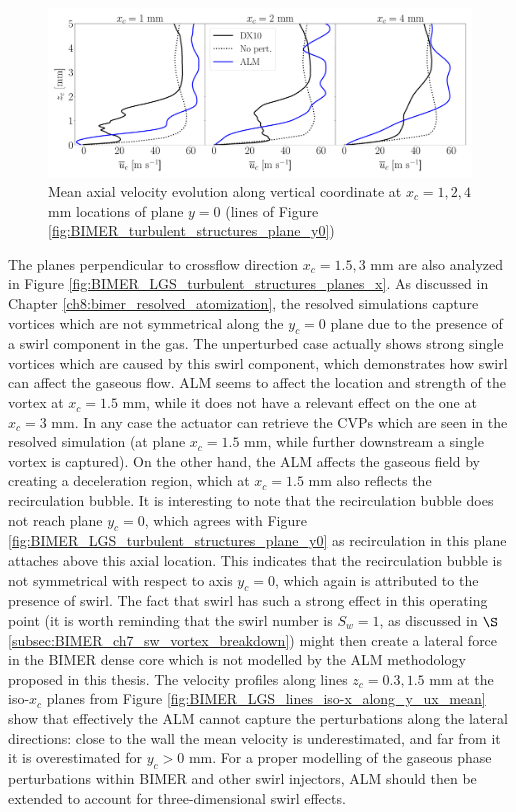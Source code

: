 \begin{figure}[ht]
\centering
   \includegraphics[scale=0.24]{./part3_applications/figures_ch9_lagrangian/gas_field_initial_conditions/lines_y0_along_z_ux_mean}
\caption{Mean axial velocity evolution along vertical coordinate at $x_c = 1, 2, 4$ mm locations of plane $y = 0$ (lines of Figure \ref{fig:BIMER_turbulent_structures_plane_y0})}
\label{fig:BIMER_LGS_lines_y0_along_z_ux_mean}
\end{figure}

The planes perpendicular to crossflow direction $x_c = 1.5, 3$ mm are also analyzed in Figure \ref{fig:BIMER_LGS_turbulent_structures_planes_x}.  As discussed in Chapter \ref{ch8:bimer_resolved_atomization}, the resolved simulations capture vortices which are not symmetrical along the $y_c = 0$ plane due to the presence of a swirl component in the gas. The unperturbed case actually shows strong single vortices which are caused by this swirl component, which demonstrates how swirl can affect the gaseous flow. ALM seems to affect the location and strength of the vortex at $x_c = 1.5$ mm, while it does not have a relevant effect on the one at $x_c = 3$ mm. In any case the actuator can retrieve the CVPs which are seen in the resolved simulation (at plane $x_c = 1.5$ mm, while further downstream a single vortex is captured). On the other hand, the ALM affects the gaseous field by creating a deceleration region, which at $x_c = 1.5$ mm also reflects the recirculation bubble. It is interesting to note that the recirculation bubble does not reach plane $y_c = 0$, which agrees with Figure \ref{fig:BIMER_LGS_turbulent_structures_plane_y0}  as recirculation in this plane attaches above this axial location. This indicates that the recirculation bubble is not symmetrical with respect to axis $y_c = 0$, which again is attributed to the presence of swirl. The fact that swirl has such a strong effect in this operating point (it is worth reminding that the swirl number is $S_w = 1$, as discussed in $\S$\ref{subsec:BIMER_ch7_sw_vortex_breakdown}) might then create a lateral force in the BIMER dense core which is not modelled by the ALM methodology proposed in this thesis. The velocity profiles along lines $z_c = 0.3, 1.5$ mm at the iso-$x_c$ planes from Figure \ref{fig:BIMER_LGS_lines_iso-x_along_y_ux_mean} show that effectively the ALM cannot capture the perturbations along the lateral directions: close to the wall the mean velocity is underestimated, and far from it it is overestimated for $y_c > 0$ mm. For a proper modelling of the gaseous phase perturbations within BIMER and other swirl injectors, ALM should then be extended to account for three-dimensional swirl effects. 


